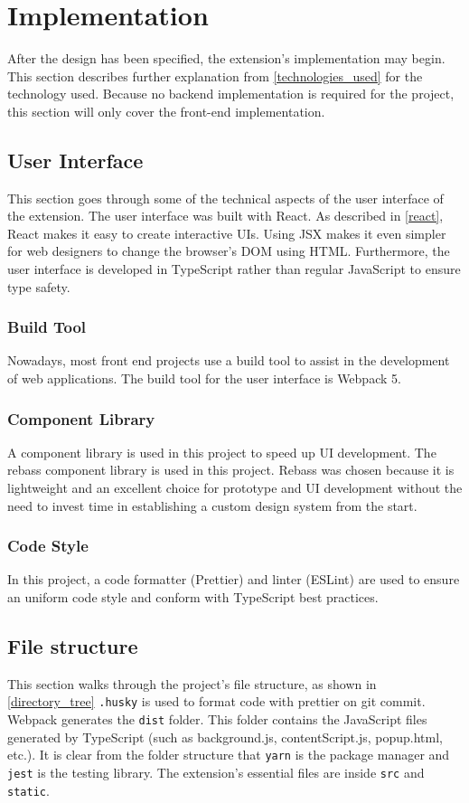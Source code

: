 \newpage
\chapter{Implementation}
After the design has been specified, the extension's implementation may begin. This section describes further explanation from \autoref{technologies_used} for the technology used. Because no backend implementation is required for the project, this section will only cover the front-end implementation.

\section{User Interface}
This section goes through some of the technical aspects of the user interface of the extension. The user interface was built with React. As described in \autoref{react}, React makes it easy to create interactive UIs. Using JSX makes it even simpler for web designers to change the browser's DOM using HTML. Furthermore, the user interface is developed in TypeScript rather than regular JavaScript to ensure type safety.

\subsection{Build Tool}
Nowadays, most front end projects use a build tool to assist in the development of web applications. The build tool for the user interface is Webpack 5.

\subsection{Component Library}
A component library is used in this project to speed up UI development. The rebass component library is used in this project. Rebass was chosen because it is lightweight and an excellent choice for prototype and UI development without the need to invest time in establishing a custom design system from the start.

\subsection{Code Style}
In this project, a code formatter (Prettier) and linter (ESLint) are used to ensure an uniform code style and conform with TypeScript best practices.

\section{File structure}
This section walks through the project's file structure, as shown in \autoref{directory_tree} \verb;.husky; is used to format code with prettier on git commit. Webpack generates the \verb;dist; folder. This folder contains the JavaScript files generated by TypeScript (such as background.js, contentScript.js, popup.html, etc.). It is clear from the folder structure that \verb;yarn; is the package manager and \verb;jest; is the testing library. The extension's essential files are inside \verb;src; and \verb;static;.

